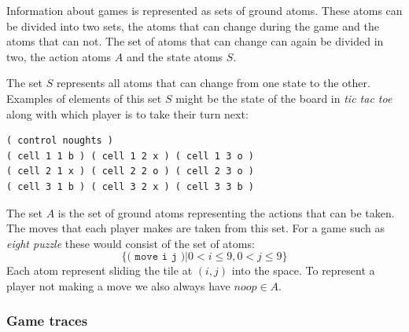 Information about games is represented as sets of ground atoms. These atoms can be divided into two sets, the atoms that can change during the game and the atoms that can not. The set of atoms that can change can again be divided in two, the action atoms $A$ and the state atoms $S$.

The set $S$ represents all atoms that can change from one state to the other. Examples of elements of this set $S$ might be the state of the board in \textit{tic tac toe} along with which player is to take their turn next:
\begin{verbatim}
( control noughts )
( cell 1 1 b ) ( cell 1 2 x ) ( cell 1 3 o )
( cell 2 1 x ) ( cell 2 2 o ) ( cell 2 3 o )
( cell 3 1 b ) ( cell 3 2 x ) ( cell 3 3 b )
\end{verbatim}

The set $A$ is the set of ground atoms representing the actions that can be taken. The moves that each player makes are taken from this set. For a game such as \textit{eight puzzle} these would consist of the set of atoms:
\[\{\texttt{( move i j )}| 0<i\leq 9, 0<j\leq 9\}\]
Each atom represent sliding the tile at $(i,j)$ into the space. To represent a player not making a move we also always have $noop \in A$.

\subsubsection{Game traces}

